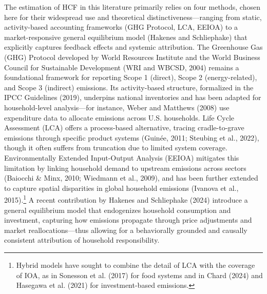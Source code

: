 \documentclass[12pt,a4paper]{article}%
\begin{document}
The estimation of HCF in this literature primarily relies on four methods, chosen here for their widespread use and theoretical distinctiveness—ranging from static, activity-based accounting frameworks (GHG Protocol, LCA, EEIOA) to a market-responsive general equilibrium model (Hakenes and Schliephake) that explicitly captures feedback effects and systemic attribution. The Greenhouse Gas (GHG) Protocol developed by World Resources Institute and the World Business Council for Sustainable Development (WRI and WBCSD, 2004) remains a foundational framework for reporting Scope 1 (direct), Scope 2 (energy-related), and Scope 3 (indirect) emissions. Its activity-based structure, formalized in the IPCC Guidelines (2019), underpins national inventories and has been adapted for household-level analysis---for instance, Weber and Matthews (2008) use expenditure data to allocate emissions across U.S. households. Life Cycle Assessment (LCA) offers a process-based alternative, tracing cradle-to-grave emissions through specific product systems (Guinée, 2011; Steubing et al., 2022), though it often suffers from truncation due to limited system coverage. Environmentally Extended Input-Output Analysis (EEIOA) mitigates this limitation by linking household demand to upstream emissions across sectors (Baiocchi \& Minx, 2010; Wiedmann et al., 2009), and has been further extended to capture spatial disparities in global household emissions (Ivanova et al., 2015).\footnote{Hybrid models have sought to combine the detail of LCA with the coverage of IOA, as in Sonesson et al. (2017) for food systems and in Chard (2024) and Hasegawa et al. (2021) for investment-based emissions.} A recent contribution by Hakenes and Schliephake (2024) introduce a general equilibrium model that endogenizes household consumption and investment, capturing how emissions propagate through price adjustments and market reallocations---thus allowing for a behaviorally grounded and causally consistent attribution of household responsibility.
\end{document}
